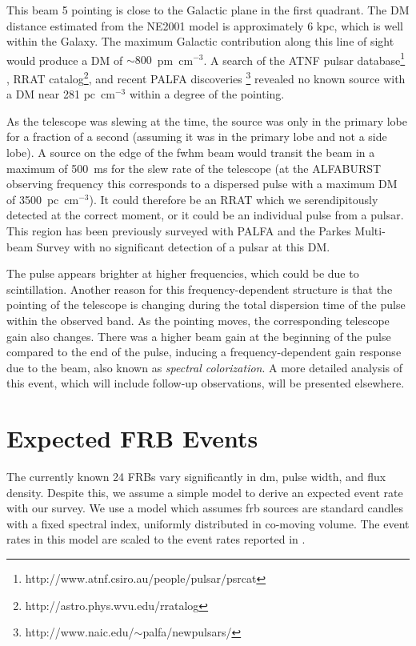 \documentclass[a4paper,fleqn,usenatbib]{mnras}
\begin{document}
This beam 5 pointing is close to the Galactic plane in the first quadrant. The
DM distance estimated from the NE2001 model \citep{2002astro.ph..7156C} is
approximately 6 kpc, which is well within the Galaxy. The maximum Galactic
contribution along this line of sight would produce a DM of
$\sim800$~pm~cm$^{-3}$.  A search of the ATNF pulsar
database\footnote{http://www.atnf.csiro.au/people/pulsar/psrcat}
\citep{2005AJ....129.1993M}, RRAT
catalog\footnote{http://astro.phys.wvu.edu/rratalog}, and recent PALFA
discoveries \footnote{http://www.naic.edu/$\sim$palfa/newpulsars/} revealed no
known source with a DM near 281 pc~cm$^{-3}$ within a degree of the pointing.

As the telescope was slewing at the time, the source was only in the primary
lobe for a fraction of a second (assuming it was in the primary lobe and not a
side lobe). A source on the edge of the \gls{fwhm} beam would transit the beam
in a maximum of 500~ms for the slew rate of the telescope (at the ALFABURST
observing frequency this corresponds to a dispersed pulse with a maximum DM of
3500~pc~cm$^{-3}$).  It could therefore be an RRAT which we serendipitously
detected at the correct moment, or it could be an individual pulse from a
pulsar. This region has been previously surveyed with PALFA and the Parkes
Multi-beam Survey \citep{2001MNRAS.328...17M} with no significant detection of a
pulsar at this DM.

The pulse appears brighter at higher frequencies, which could be due to
scintillation. Another reason for this frequency-dependent structure is that the
pointing of the telescope is changing during the total dispersion time of the
pulse within the observed band. As the pointing moves, the corresponding
telescope gain also changes.  There was a higher beam gain at the beginning of
the pulse compared to the end of the pulse, inducing a frequency-dependent gain
response due to the beam, also known as \emph{spectral colorization}.  A more
detailed analysis of this event, which will include follow-up observations, will
be presented elsewhere.



\section{Expected FRB Events}
\label{sec:event_rates}

The currently known 24 FRBs vary significantly in \gls{dm}, pulse
width, and flux density. Despite this, we assume a simple model to
derive an expected event rate with our survey.  We use a model
\citep{2013MNRAS.436L...5L} which assumes \gls{frb} sources are
standard candles with a fixed spectral index, uniformly distributed in
co-moving volume. The event rates in this model are scaled to the
event rates reported in \cite{2013Sci...341...53T}. 
\end{document}
